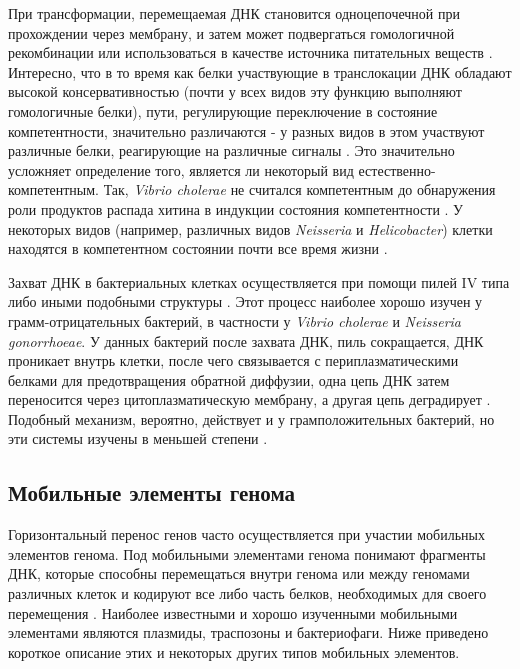При трансформации, перемещаемая  ДНК становится одноцепочечной при прохождении через мембрану, и затем может подвергаться гомологичной рекомбинации или использоваться в качестве источника питательных веществ \cite{finkel2001dna}. Интересно, что в то время как белки участвующие в транслокации ДНК обладают высокой консервативностью (почти у всех видов эту функцию выполняют гомологичные белки), пути, регулирующие переключение в состояние компетентности, значительно различаются - у разных видов в этом участвуют различные белки, реагирующие на различные сигналы \cite{johnston2014bacterial}. Это значительно усложняет определение того, является ли некоторый вид естественно-компетентным. Так, \textit{Vibrio cholerae} не считался компетентным до обнаружения роли продуктов распада хитина в индукции состояния компетентности \cite{mell2014natural}. У некоторых видов (например, различных видов \textit{Neisseria} и \textit{Helicobacter}) клетки находятся в компетентном состоянии почти все время жизни \cite{dubnau2019mechanisms}.

Захват ДНК в бактериальных клетках осуществляется при помощи пилей IV типа либо иными подобными структуры \cite{piepenbrink2019dna}. Этот процесс наиболее хорошо изучен у грамм-отрицательных бактерий, в частности у \textit{Vibrio cholerae} и \textit{Neisseria gonorrhoeae}. У данных бактерий после захвата ДНК, пиль сокращается, ДНК проникает внутрь клетки, после чего связывается с периплазматическими белками для предотвращения обратной диффузии, одна цепь ДНК затем переносится через цитоплазматическую мембрану, а другая цепь деградирует \cite{dubnau2019mechanisms}. Подобный механизм, вероятно,
действует и у грамположительных бактерий, но эти системы изучены в меньшей степени \cite{dubnau2019mechanisms}.

\subsection{Мобильные элементы генома}
Горизонтальный перенос генов часто осуществляется при участии мобильных элементов генома. Под мобильными элементами генома понимают фрагменты ДНК, которые способны перемещаться внутри генома или между геномами различных клеток и кодируют все либо часть белков, необходимых для своего перемещения \cite{bellanger2014conjugative}. Наиболее известными и хорошо изученными мобильными элементами являются плазмиды, траспозоны и бактериофаги. Ниже приведено короткое описание этих и некоторых других типов мобильных элементов. 

